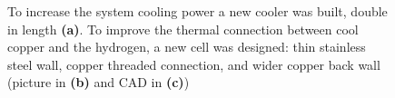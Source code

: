 \begin{refsection}
        \begin{figure}[]   
            \centering
            \hfill
            \hfill
            \caption[CEX 2023: new cell and cooler]{To increase the system cooling power a new cooler was built, double in length \textbf{(a)}. To improve the thermal connection between cool copper and the hydrogen, a new cell was designed: thin stainless steel wall, copper threaded connection, and wider copper back wall (picture in \textbf{(b)} and CAD in \textbf{(c)})}
            \label{fig:CEX:2023:sensors}
        \end{figure}



\end{refsection}
